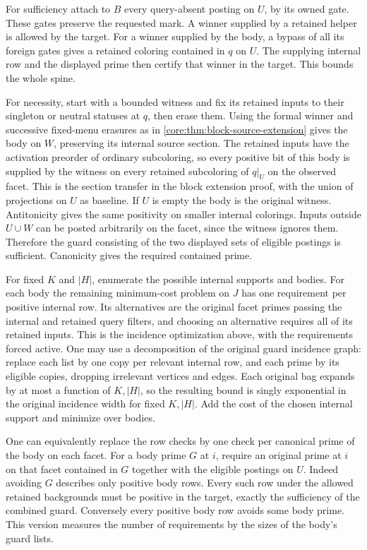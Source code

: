 For sufficiency attach to $B$ every query-absent
posting on $U$, by its owned gate. These gates
preserve the requested mark. A winner supplied
by a retained helper is allowed by the target.
For a winner supplied by the body, a bypass of
all its foreign gates gives a retained coloring
contained in $q$ on $U$. The supplying internal
row and the displayed prime then certify that
winner in the target. This bounds the whole
spine.

For necessity, start with a bounded witness and
fix its retained inputs to their singleton or
neutral statuses at $q$, then erase them.
Using the formal winner and successive
fixed-menu erasures as in
\cref{core:thm:block-source-extension} gives the
body on $W$, preserving its internal source
section. The retained inputs have the activation
preorder of ordinary subcoloring, so every positive
bit of this body is supplied by the witness on
every retained subcoloring of $q|_U$ on the
observed facet. This is the section transfer in
the block extension proof, with the union of
projections on $U$ as baseline. If $U$ is empty
the body is the original witness. Antitonicity
gives the same positivity on smaller internal
colorings. Inputs outside $U\cup W$ can be posted
arbitrarily on the facet, since the witness ignores
them. Therefore the guard consisting of the two
displayed sets of eligible postings is sufficient.
Canonicity gives the required contained prime.

For fixed $K$ and $|H|$, enumerate the possible
internal supports and bodies. For each body the
remaining minimum-cost problem on $J$ has one
requirement per positive internal row. Its
alternatives are the original facet primes
passing the internal and retained query filters,
and choosing an alternative requires all of its
retained inputs. This is the incidence
optimization above, with the requirements forced
active. One may use a decomposition of the
original guard incidence graph: replace each list
by one copy per relevant internal row, and each
prime by its eligible copies, dropping irrelevant
vertices and edges. Each original bag expands by
at most a function of $K,|H|$, so the resulting
bound is singly exponential in the original
incidence width for fixed $K,|H|$. Add the cost of
the chosen internal support and minimize over
bodies.

One can equivalently replace the row checks by
one check per canonical prime of the body on
each facet. For a body prime $G$ at $i$, require
an original prime at $i$ on that facet contained
in $G$ together with the eligible postings on
$U$. Indeed avoiding $G$ describes only positive
body rows. Every such row under the allowed
retained backgrounds must be positive in the
target, exactly the sufficiency of the combined
guard. Conversely every positive body row avoids
some body prime. This version measures the
number of requirements by the sizes of the
body's guard lists.

